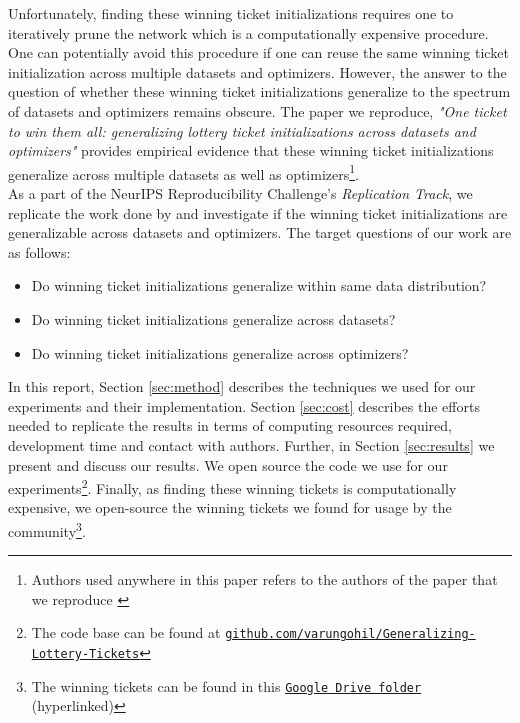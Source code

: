     Unfortunately, finding these winning ticket initializations requires one to iteratively prune the network which is a computationally expensive procedure. One can potentially avoid this procedure if one can reuse the same winning ticket initialization across multiple datasets and optimizers. However, the answer to the question of whether these winning ticket initializations generalize to the spectrum of datasets and optimizers remains obscure. The paper we reproduce,  \textit{"One ticket to win them all: generalizing lottery ticket initializations across datasets and optimizers"} \cite{repro_paper} provides empirical evidence that these winning ticket initializations generalize across multiple datasets as well as optimizers\footnote{Authors used anywhere in this paper refers to the authors of the paper that we reproduce \cite{repro_paper}}.\\
     
     
    As a part of the NeurIPS Reproducibility Challenge's \textit{Replication Track}, we replicate the work done by \cite{repro_paper} and investigate if the winning ticket initializations are generalizable across datasets and optimizers. The target questions of our work are as follows:
    \begin{itemize}
        \item Do winning ticket initializations generalize within same data distribution?
        \item Do winning ticket initializations generalize across datasets?
        \item Do winning ticket initializations generalize across optimizers?
    \end{itemize}
    
    In this report, Section \ref{sec:method} describes the techniques we used for our experiments and their implementation.  Section \ref{sec:cost} describes the efforts needed to replicate the results in terms of computing resources required, development time and contact with authors. Further, in Section \ref{sec:results} we present and discuss our results. We open source the code we use for our experiments\footnote{The code base can be found at \href{https://github.com/varungohil/Generalizing-Lottery-Tickets}{\texttt{github.com/varungohil/Generalizing-Lottery-Tickets}}}. Finally, as finding these winning tickets is computationally expensive, we open-source the winning tickets we found for usage by the community\footnote{The winning tickets can be found in this  \href{https://drive.google.com/drive/folders/1Nd-J4EwmgWbUARYaqe9iCF6efEFf9S2P?usp=sharing}{\texttt{Google Drive folder}} (hyperlinked)}. 
    
